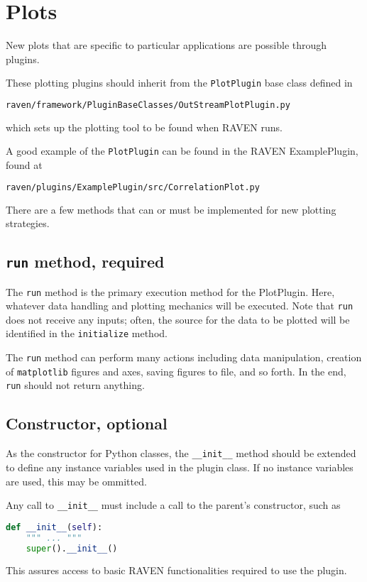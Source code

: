 \section{Plots}
\label{sec:outstreams_plot}
New plots that are specific to particular applications are possible through 
 plugins.

These plotting plugins should inherit from the \texttt{PlotPlugin} base class defined in
\begin{lstlisting}[language=bash]
  raven/framework/PluginBaseClasses/OutStreamPlotPlugin.py
\end{lstlisting}
which sets up the plotting tool to be found when RAVEN runs.

A good example of the \texttt{PlotPlugin} can be found in the RAVEN ExamplePlugin, found at
\begin{lstlisting}[language=bash]
  raven/plugins/ExamplePlugin/src/CorrelationPlot.py
\end{lstlisting}

There are a few methods that can or must be implemented for new plotting strategies.

%
%
\subsection{\texttt{run} method, required}
The \texttt{run} method is the primary execution method for the PlotPlugin. Here, whatever data
handling and plotting mechanics will be executed. Note that \texttt{run} does not receive any inputs;
often, the source for the data to be plotted will be identified in the \texttt{initialize} method.

The \texttt{run} method can perform many actions including data manipulation, creation of
\texttt{matplotlib} figures and axes, saving figures to file, and so forth. In the end, \texttt{run}
should not return anything.

%
%
\subsection{Constructor, optional}
As the constructor for Python classes, the \texttt{\_\_init\_\_} method should be extended to define
any instance variables used in the plugin class. If no instance variables are used, this may be ommitted.

Any call to \texttt{\_\_init\_\_} must include a call to the parent's constructor, such as
\begin{lstlisting}[language=python]
  def __init__(self):
    """ ... """
    super().__init__()
\end{lstlisting}
This assures access to basic RAVEN functionalities required to use the plugin.

